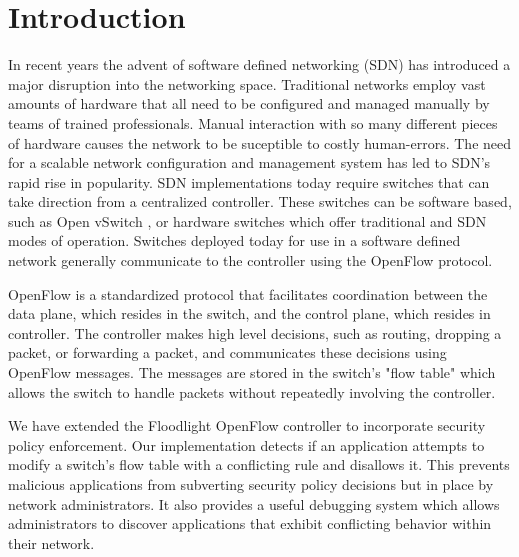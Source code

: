 \section{Introduction}
\label{sec:intro}

In recent years the advent of software defined networking (SDN) has introduced a major disruption into the networking space.
Traditional networks employ vast amounts of hardware that all need to be configured and managed manually by teams of trained professionals.
Manual interaction with so many different pieces of hardware causes the network to be suceptible to costly human-errors. 
The need for a scalable network configuration and management system has led to SDN's rapid rise in popularity.
SDN implementations today require switches that can take direction from a centralized controller.
These switches can be software based, such as Open vSwitch \cite{DBLP:conf/hotnets/PfaffPACKS09}, or hardware switches which offer traditional and SDN modes of operation.
Switches deployed today for use in a software defined network generally communicate to the controller using the OpenFlow protocol.

OpenFlow \cite{McKeown:2008:OEI:1355734.1355746} is a standardized protocol that facilitates coordination between the data plane, which resides in the switch, and the control plane, which resides in controller.
The controller makes high level decisions, such as routing, dropping a packet, or forwarding a packet, and communicates these decisions using OpenFlow messages.
The messages are stored in the switch's "flow table" which allows the switch to handle packets without repeatedly involving the controller. 


We have extended the Floodlight OpenFlow controller \cite{floodlight} to incorporate security policy enforcement.
Our implementation detects if an application attempts to modify a switch's flow table with a conflicting rule and disallows it.
This prevents malicious applications from subverting security policy decisions but in place by network administrators.
It also provides a useful debugging system which allows administrators to discover applications that exhibit conflicting behavior within their network.

